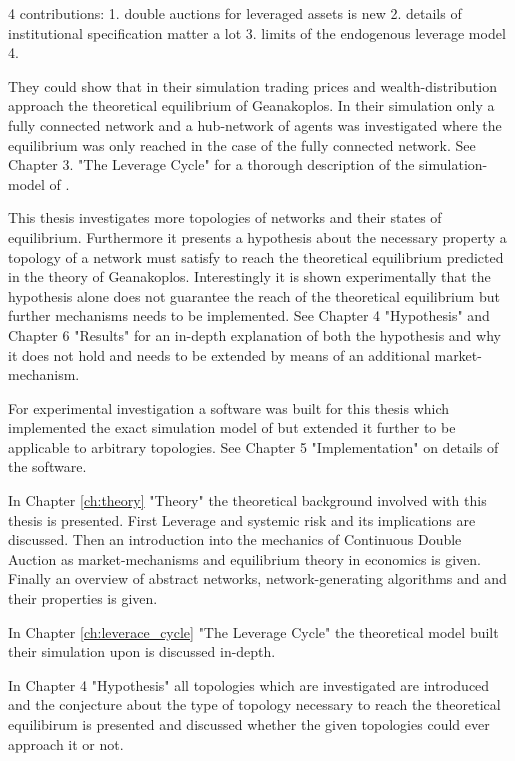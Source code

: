 \documentclass[Bachelorarbeit.tex]{subfiles}
\begin{document}
4 contributions:
1. double auctions for leveraged assets is new
2. details of institutional specification matter a lot
3. limits of the endogenous leverage model
4. 

They could show that in their simulation trading prices and wealth-distribution approach the theoretical equilibrium of Geanakoplos.
In their simulation only a fully connected network and a hub-network of agents was investigated where the equilibrium was only reached in the case of the fully connected network. See Chapter 3. "The Leverage Cycle" for a thorough description of the simulation-model of \cite{Breuer2015}. 

\thinspace

This thesis investigates more topologies of networks and their states of equilibrium. Furthermore it presents a hypothesis about the necessary property a topology of a network must satisfy to reach the theoretical equilibrium predicted in the theory of Geanakoplos. 
Interestingly it is shown experimentally that the hypothesis alone does not guarantee
the reach of the theoretical equilibrium but further mechanisms needs to be implemented.
See Chapter 4 "Hypothesis" and Chapter 6 "Results" for an in-depth explanation of both the hypothesis and why it does not hold and needs to be extended by means of an additional market-mechanism.

\thinspace

For experimental investigation a software was built for this thesis which 
implemented the exact simulation model of \cite{Breuer2015} but extended it further to be 
applicable to arbitrary topologies. See Chapter 5 "Implementation" on details of the software.

\bigskip

In Chapter \ref{ch:theory} "Theory" the theoretical background involved with this thesis is presented. First Leverage and systemic risk and its implications are discussed. Then an introduction into the mechanics of Continuous Double Auction as market-mechanisms and equilibrium theory in economics is given. Finally an overview of abstract networks, network-generating algorithms and and their properties is given.

\bigskip

In Chapter \ref{ch:leverace_cycle} "The Leverage Cycle" the theoretical model \cite{Breuer2015} built their simulation upon is discussed in-depth.

\bigskip

In Chapter 4 "Hypothesis" all topologies which are investigated are introduced and the conjecture about the type of topology necessary to reach the theoretical equilibirum is presented and discussed whether the given topologies could ever approach it or not.
\end{document}
